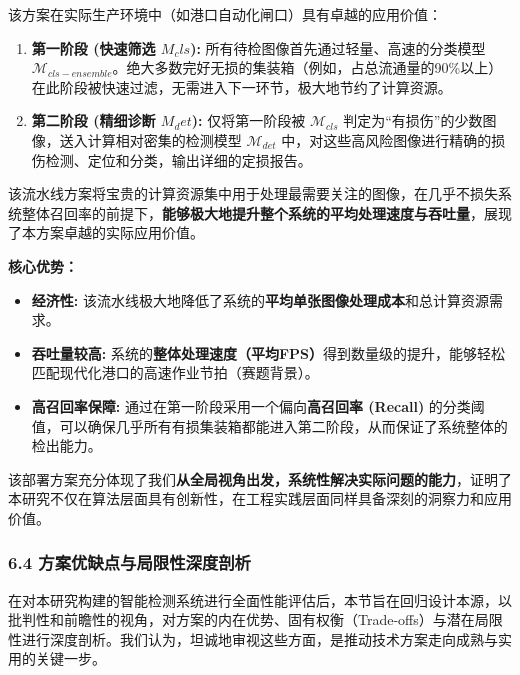 \documentclass[
]{article}
\begin{document}
该方案在实际生产环境中（如港口自动化闸口）具有卓越的应用价值：

\begin{enumerate}
\def\labelenumi{\arabic{enumi}.}
\item
  \textbf{第一阶段 (快速筛选 \textbar{} \(M_cls\)):}
  所有待检图像首先通过轻量、高速的分类模型
  \(\mathcal{M}_{cls-ensemble}\)。绝大多数完好无损的集装箱（例如，占总流通量的90\%以上）在此阶段被快速过滤，无需进入下一环节，极大地节约了计算资源。
\item
  \textbf{第二阶段 (精细诊断 \textbar{} \(M_det\)): }仅将第一阶段被
  \(\mathcal{M}_{cls}\)
  判定为``有损伤''的少数图像，送入计算相对密集的检测模型
  \(\mathcal{M}_{det}\)
  中，对这些高风险图像进行精确的损伤检测、定位和分类，输出详细的定损报告。
\end{enumerate}

该流水线方案将宝贵的计算资源集中用于处理最需要关注的图像，在几乎不损失系统整体召回率的前提下，\textbf{能够极大地提升整个系统的平均处理速度与吞吐量}，展现了本方案卓越的实际应用价值。

\textbf{核心优势：}

\begin{itemize}
\item
  \textbf{经济性:}
  该流水线极大地降低了系统的\textbf{平均单张图像处理成本}和总计算资源需求。
\item
  \textbf{吞吐量较高:}
  系统的\textbf{整体处理速度（平均FPS）}得到数量级的提升，能够轻松匹配现代化港口的高速作业节拍（赛题背景）。
\item
  \textbf{高召回率保障:} 通过在第一阶段采用一个偏向\textbf{高召回率
  (Recall)}
  的分类阈值，可以确保几乎所有有损集装箱都能进入第二阶段，从而保证了系统整体的检出能力。
\end{itemize}

该部署方案充分体现了我们\textbf{从全局视角出发，系统性解决实际问题的能力}，证明了本研究不仅在算法层面具有创新性，在工程实践层面同样具备深刻的洞察力和应用价值。

\subsubsection{\texorpdfstring{\textbf{6.4
方案优缺点与局限性深度剖析}}{6.4 方案优缺点与局限性深度剖析}}\label{64-ux65b9ux6848ux4f18ux7f3aux70b9ux4e0eux5c40ux9650ux6027ux6df1ux5ea6ux5256ux6790}

在对本研究构建的智能检测系统进行全面性能评估后，本节旨在回归设计本源，以批判性和前瞻性的视角，对方案的内在优势、固有权衡（Trade-offs）与潜在局限性进行深度剖析。我们认为，坦诚地审视这些方面，是推动技术方案走向成熟与实用的关键一步。
\end{document}

